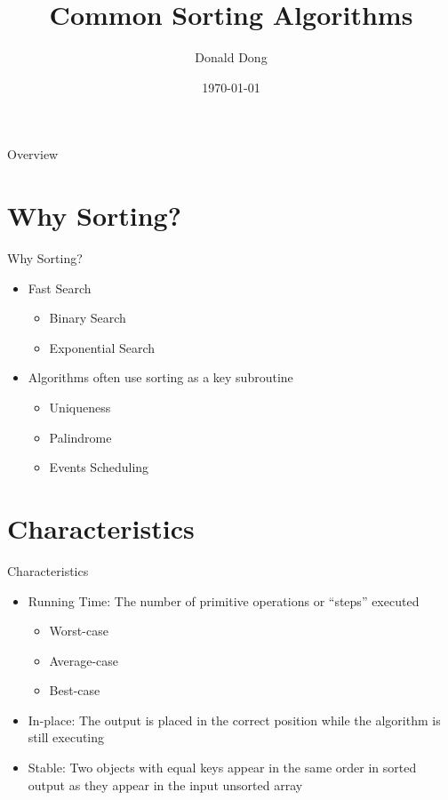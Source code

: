 \documentclass{beamer}
\title[Sorting]{Common Sorting Algorithms \cite{CLRS}}
\author{Donald Dong}
\institute[MBPT] 
{
    Monterey Bay  Programming Team \\ 
    \medskip
    \textit{xdong@csumb.edu}
}
\date{\today}
\begin{document}
\begin{frame}
    \titlepage
\end{frame}
\begin{frame}{Overview}
    \begin{multicols}{2}
        \tableofcontents
    \end{multicols}
\end{frame}
\section{Why Sorting?}
\begin{frame}{Why Sorting?}
    \begin{itemize}
        \setlength\itemsep{2em}
        \item Fast Search
        \begin{itemize}
            \item Binary Search
            \item Exponential Search
        \end{itemize}
        \item Algorithms often use sorting as a key subroutine
        \begin{itemize}
            \item Uniqueness
            \item Palindrome
            \item Events Scheduling
        \end{itemize}
    \end{itemize}
\end{frame}
\section{Characteristics}
\begin{frame}{Characteristics}
    \begin{itemize}
        \setlength\itemsep{1em}
        \item Running Time: The number of primitive operations or “steps” executed
        \begin{itemize}
            \setlength\itemsep{0.5em} 
            \item Worst-case
            \item Average-case
            \item Best-case
        \end{itemize}
        \item In-place: The output is placed in the correct position 
            while the algorithm is still executing
        \item Stable: Two objects with equal keys appear in the same order 
            in sorted output as they appear in the input unsorted array
    \end{itemize}
\end{frame}
\end{document}
